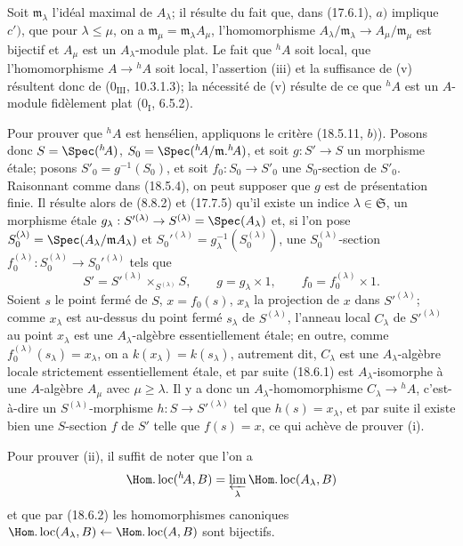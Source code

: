 
Soit $\mathfrak m_\lambda$ l'idéal maximal de $A_\lambda$; il résulte du fait que, dans (17.6.1), $a)$ implique $c')$, que pour $\lambda\leq\mu$, on a $\mathfrak m_\mu=\mathfrak m_\lambda A_\mu$, l'homomorphisme $A_\lambda/\mathfrak m_\lambda\to A_\mu/\mathfrak m_\mu$ est bijectif et $A_\mu$ est un $A_\lambda$-module plat. Le fait que ${}^h\!A$ soit local, que l'homomorphisme $A\to{}^h\!A$ soit local, l'assertion (iii) et la suffisance de (v) résultent donc de ($0_{\mathrm{III}}$, 10.3.1.3); la nécessité de (v) résulte de ce que ${}^h\!A$ est un $A$-module fidèlement plat ($0_{\mathrm I}$, 6.5.2).

Pour prouver que ${}^h\!A$ est hensélien, appliquons le critère (18.5.11, $b)$). Posons donc $S=\Spec({}^h\!A)$, $S_0=\Spec({}^h\!A/\mathfrak m.{}^h\!A)$, et soit $g:S'\to S$ un morphisme étale; posons $S'_0=g^{-1}(S_0)$, et soit $f_0:S_0\to S'_0$ une $S_0$-section de $S'_0$. Raisonnant comme dans (18.5.4), on peut supposer que $g$ est de présentation finie. Il résulte alors de (8.8.2) et (17.7.5) qu'il existe un indice $\lambda\in\mathfrak S$, un morphisme étale $g_\lambda:S'^{(\lambda)}\to S^{(\lambda)}=\Spec(A_\lambda)$ et, si l'on pose $S_0^{(\lambda)}=\Spec(A_\lambda/\mathfrak mA_\lambda)$ et $S_0'^{(\lambda)}=g_\lambda^{-1}(S_0^{(\lambda)})$, une $S_0^{(\lambda)}$-section $f_0^{(\lambda)}:S_0^{(\lambda)}\to S_0'^{(\lambda)}$ tels que
\[
  S'=S'^{(\lambda)}\times_{S^{(\lambda)}}S,\qquad
  g=g_\lambda\times1,\qquad
  f_0=f_0^{(\lambda)}\times1.
\]
Soient $s$ le point fermé de $S$, $x=f_0(s)$, $x_\lambda$ la projection de $x$ dans $S'^{(\lambda)}$; comme $x_\lambda$ est au-dessus du point fermé $s_\lambda$ de $S^{(\lambda)}$, l'anneau local $C_\lambda$ de $S'^{(\lambda)}$ au point $x_\lambda$ est une $A_\lambda$-algèbre essentiellement étale; en outre, comme $f_0^{(\lambda)}(s_\lambda)=x_\lambda$, on a $k(x_\lambda)=k(s_\lambda)$, autrement dit, $C_\lambda$ est une $A_\lambda$-algèbre locale strictement essentiellement étale, et par suite (18.6.1) est $A_\lambda$-isomorphe à une $A$-algèbre $A_\mu$ avec $\mu\geq\lambda$. Il y a donc un $A_\lambda$-homomorphisme $C_\lambda\to{}^h\!A$, c'est-à-dire un $S^{(\lambda)}$-morphisme $h:S\to S'^{(\lambda)}$ tel que $h(s)=x_\lambda$, et par suite il existe bien une $S$-section $f$ de $S'$ telle que $f(s)=x$, ce qui achève de prouver (i).

Pour prouver (ii), il suffit de noter que l'on a
\[
  \Hom.\operatorname{loc}({}^h\!A,B)=\varprojlim_\lambda\Hom.\operatorname{loc}(A_\lambda,B)
\]
et que par (18.6.2) les homomorphismes canoniques $\Hom.\operatorname{loc}(A_\lambda,B)\leftarrow\Hom.\operatorname{loc}(A,B)$ sont bijectifs.

